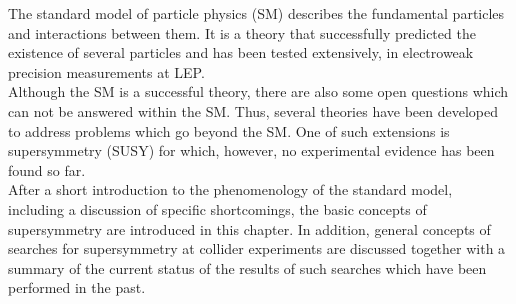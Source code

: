 The standard model of particle physics (SM) describes the fundamental particles and interactions between them. It is a theory that successfully predicted the existence of several particles and has been tested extensively, \eg in electroweak precision measurements at LEP. \\
Although the SM is a successful theory, there are also some open questions which can not be answered within the SM. Thus, several theories have been developed to address problems which go beyond the SM. One of such extensions is supersymmetry (SUSY) for which, however, no experimental evidence has been found so far. \\
After a short introduction to the phenomenology of the standard model, including a discussion of specific shortcomings, the basic concepts of supersymmetry are introduced in this chapter. In addition, general concepts of searches for supersymmetry at collider experiments are discussed together with a summary of the current status of the results of such searches which have been performed in the past.
